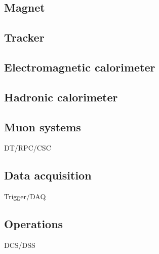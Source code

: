 
\subsection{Magnet}

\cite{Acquistapace:1997fm}

\subsection{Tracker}



\cite{Chatrchyan:2014fea}

\subsection{Electromagnetic calorimeter}

\subsection{Hadronic calorimeter}

\subsection{Muon systems}
DT/RPC/CSC

\subsection{Data acquisition}
Trigger/DAQ

\subsection{Operations}
DCS/DSS
